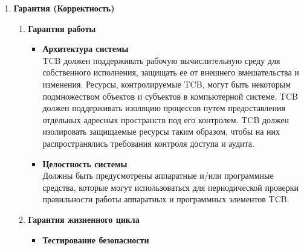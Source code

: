 \begin{enumerate}
\begin{enumerate}
\begin{enumerate}
\begin{enumerate}
                удаление объектов, действия операторов и системных администраторов и/или сотрудников безопасности системы и другие события, связанные с безопасностью. Для каждого зарегистрированного
                события в журнале аудита должно быть указано: время и дата наступления события, пользователь, совершивший действие, тип события, результат события (успех/неудача). Для событий
                идентификации/аутентификации в журнале аудита должно быть указано происхождение запроса (\textit{прим. } кем инициировано событие) (\textit{напр.} идентификатор терминала). Для событий,
                вводящих объект в адресное пространство пользователя и удаляющих объект, запись в журнале аудита должна содержать имя объекта. Администратор системы должен иметь возможность выборочно
                проверять действия любого пользователя системы.
            \end{enumerate}
            \item{\textbf{Гарантия (Корректность)}}
            \begin{enumerate}
                \item{\textbf{Гарантия работы}}
                \begin{itemize}
                    \item{\textbf{Архитектура системы}}\\
                    TCB должен поддерживать рабочую вычислительную среду для собственного исполнения, защищать ее от внешнего вмешательства и изменения. Ресурсы, контролируемые TCB, могут быть
                    некоторым подмножеством объектов и субъектов в компьютерной системе. TCB должен поддерживать изоляцию процессов путем предоставления отдельных адресных пространств под его контролем.
                    TCB должен изолировать защищаемые ресурсы таким образом, чтобы на них распространялись требования контроля доступа и аудита.
                    \item{\textbf{Целостность системы}}\\
                    Должны быть предусмотрены аппаратные и/или программные средства, которые могут использоваться для периодической проверки правильности работы аппаратных и программных элементов TCB.
                \end{itemize}
                \item{\textbf{Гарантия жизненного цикла}}
                \begin{itemize}
                    \item{\textbf{Тестирование безопасности}}\\

\end{itemize}
\end{enumerate}
\end{enumerate}
\end{enumerate}
\end{enumerate}
